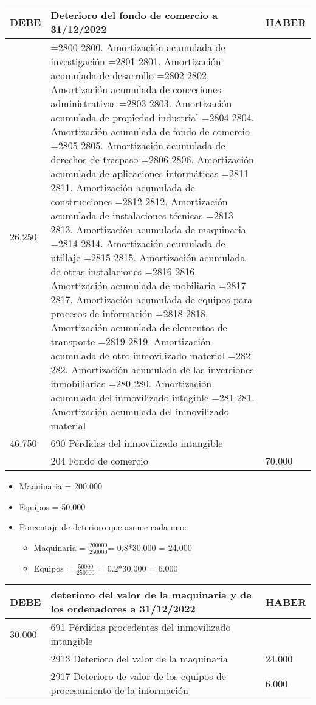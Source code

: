 \documentclass[a4paper,12pt]{article}
\newcommand{\fec}{31/12/}
\newcommand{\DVM}{2913 Deterioro del valor de la maquinaria }
\newcommand{\myequation}[2]{\ensuremath{\frac{#1}{#2}}}
\newcommand{\cuenta}[1]{
    \ifnum#1=2800 2800. Amortización acumulada de investigación\fi
    \ifnum#1=2801 2801. Amortización acumulada de desarrollo\fi
    \ifnum#1=2802 2802. Amortización acumulada de concesiones administrativas\fi
    \ifnum#1=2803 2803. Amortización acumulada de propiedad industrial\fi
    \ifnum#1=2804 2804. Amortización acumulada de fondo de comercio\fi
    \ifnum#1=2805 2805. Amortización acumulada de derechos de traspaso\fi
    \ifnum#1=2806 2806. Amortización acumulada de aplicaciones informáticas\fi
    \ifnum#1=2811 2811. Amortización acumulada de construcciones\fi
    \ifnum#1=2812 2812. Amortización acumulada de instalaciones técnicas\fi
    \ifnum#1=2813 2813. Amortización acumulada de maquinaria\fi
    \ifnum#1=2814 2814. Amortización acumulada de utillaje\fi
    \ifnum#1=2815 2815. Amortización acumulada de otras instalaciones\fi
    \ifnum#1=2816 2816. Amortización acumulada de mobiliario\fi
    \ifnum#1=2817 2817. Amortización acumulada de equipos para procesos de información\fi
    \ifnum#1=2818 2818. Amortización acumulada de elementos de transporte\fi
    \ifnum#1=2819 2819. Amortización acumulada de otro inmovilizado material\fi
    \ifnum#1=282 282. Amortización acumulada de las inversiones inmobiliarias\fi
    \ifnum#1=280 280. Amortización acumulada del inmovilizado intagible\fi
    \ifnum#1=281 281. Amortización acumulada del inmovilizado material\fi
}
\begin{document}
\begin{table}[H]
    \centering
    \begin{tabular}{|p{3cm}|p{6cm}|p{3cm}|}
    \hline
    \textbf{DEBE} & \textbf{Deterioro del fondo de comercio a \fec2022} & \textbf{HABER} \\
    \hline
    26.250& \cuenta{2804}& \\
    \hline
    46.750& 690 Pérdidas del inmovilizado intangible& \\
    \hline
    & 204 Fondo de comercio& 70.000\\
    \hline
    \end{tabular}
\end{table}

\begin{itemize}
    \item Maquinaria = 200.000
    \item Equipos = 50.000
    \item Porcentaje de deterioro que asume cada uno:
    \begin{itemize}
        \item Maquinaria = \myequation{200000}{250000}= 0.8*30.000 = 24.000
        \item Equipos = \myequation{50000}{250000} = 0.2*30.000 = 6.000
    \end{itemize}
\end{itemize}

\begin{table}[H]
    \centering
    \begin{tabular}{|p{3cm}|p{6cm}|p{3cm}|}
    \hline
    \textbf{DEBE} & \textbf{deterioro del valor de la maquinaria y de los ordenadores a \fec2022} & \textbf{HABER} \\
    \hline
    30.000& 691 Pérdidas procedentes del inmovilizado intangible& \\
    \hline
    & \DVM &24.000 \\
    \hline
    & 2917 Deterioro de valor de los equipos de procesamiento de la información & 6.000 \\
    \hline
    \end{tabular}
\end{table}
\end{document}
